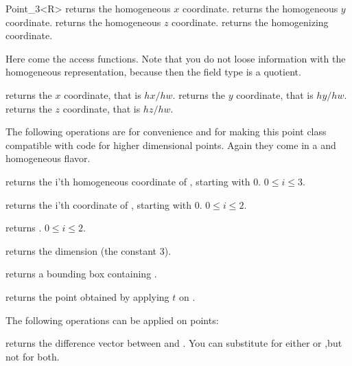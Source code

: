 \begin{ccRefClass} {Point_3<R>}
       {returns the homogeneous $x$ coordinate.}
\ccGlue
{}
       {returns the homogeneous $y$ coordinate.}
\ccGlue
{}
       {returns the homogeneous $z$ coordinate.}
\ccGlue
{}
       {returns the homogenizing  coordinate.}

Here come the  access functions. Note that you do not loose
information with the homogeneous representation, because then the field
type is a quotient.

       {returns the  $x$ coordinate, that is $hx/hw$.}
\ccGlue
{}
       {returns the  $y$ coordinate, that is $hy/hw$.}
\ccGlue
{}
       {returns the  $z$ coordinate, that is $hz/hw$.}


The following operations are for convenience and for making this
point class compatible with code for higher dimensional points.
Again they come in a  and homogeneous flavor.

       {returns the i'th homogeneous coordinate of \ccVar, starting with 0.
        \ccPrecond $0\leq i \leq 3$.}

       {returns the i'th  coordinate of \ccVar, starting with 0.
        \ccPrecond $0\leq i \leq 2$.}

       {returns .
        \ccPrecond $0\leq i \leq 2$.}

       {returns the dimension (the constant 3).}

       {returns a bounding box containing \ccVar.}

       {returns the point obtained by applying $t$ on \ccVar.}


The following operations can be applied on points:

       {returns the difference vector between  and . 
        You can substitute  for either  or 
        ,but not for both.}


\end{ccRefClass}
